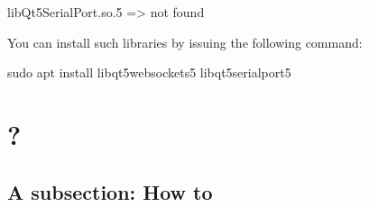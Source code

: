 \begin{DoxyPre}libQt5SerialPort.so.5 => not found\end{DoxyPre}


You can install such libraries by issuing the following command\+:


\begin{DoxyPre}sudo apt install libqt5websockets5 libqt5serialport5\end{DoxyPre}
\hypertarget{index_boh}{}\section{?}\label{index_boh}
\hypertarget{index_sub1}{}\subsection{A subsection\+: How to}\label{index_sub1}
